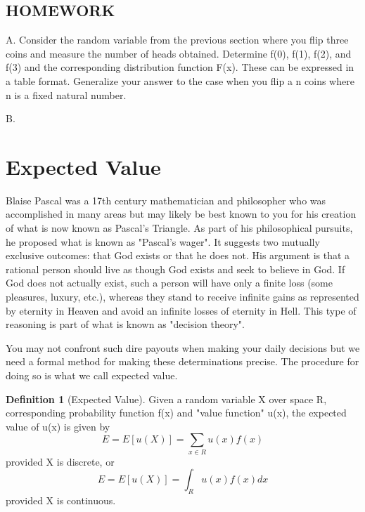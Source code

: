 \documentclass[10pt,]{book}
\theoremstyle{plain}
\theoremstyle{definition}
\newtheorem{definition}[theorem]{Definition}
\theoremstyle{definition}
\theoremstyle{definition}
\numberwithin{equation}{section}
\begin{document}
\subsection[{HOMEWORK}]{HOMEWORK}\label{subsection-11}

	A.  Consider the random variable from the previous section where you flip three coins and measure the number of heads obtained. Determine f(0), f(1), f(2), and f(3) and the corresponding distribution function F(x). These can be expressed in a table format. Generalize your answer to the case when you flip a n coins where n is a fixed natural number.
\par

	B.  
\typeout{************************************************}
\typeout{************************************************}
\section[{Expected Value}]{Expected Value}\label{section-26}
Blaise Pascal was a 	17th century mathematician and philosopher who was accomplished in many areas but may likely be best known to you for his creation of what is now known as Pascal's Triangle. As part of his philosophical pursuits, he proposed what is known as "Pascal's wager". It suggests two  mutually exclusive outcomes: that God exists or that he does not. His argument is that a rational person should live as though God exists and seek to believe in God. If God does not actually exist, such a person will have only a finite loss (some pleasures, luxury, etc.), whereas they stand to receive infinite gains as represented by eternity in Heaven and avoid an infinite losses of eternity in Hell. This type of reasoning is part of what is known as "decision theory".
\par
You may not confront such dire payouts when making your daily decisions but we need a formal method for making these determinations precise. The procedure for doing so is what we call expected value.
\begin{definition}[{Expected Value}]\label{definition-26}
Given a random variable X over space R, corresponding probability function f(x) and "value function" u(x), the expected value of u(x) is given by
	\begin{equation*}E = E[u(X)] = \sum_{x \in R} u(x) f(x)\end{equation*}
	provided X is discrete, or
	\begin{equation*}E = E[u(X)] = \int_R u(x)f(x) dx\end{equation*}
	provided X is continuous.
\end{definition}
\end{document}
